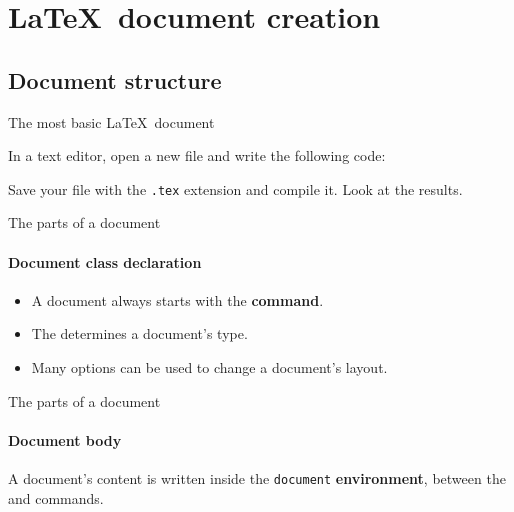 
\section{\LaTeX\ document creation}

\subsection{Document structure}

\begin{frame}[c,fragile]{The most basic \LaTeX\ document}

	In a text editor, open a new file and write the following code:
	

	Save your file with the \texttt{.tex} extension and compile it. Look at the results.
	
\end{frame}

\begin{frame}[c,fragile]{The parts of a document}
	\framesubtitle{Document class declaration}
	\begin{itemize}
		\item A document always starts with the  \textbf{command}.
		

		\item The 
			determines a document's type.		
		\item Many options can be used to change a document's layout.
	\end{itemize}
\end{frame}

\begin{frame}[c,fragile]{The parts of a document}
	\framesubtitle{Document body}
	A document's content is written inside the \texttt{document} \textbf{environment},
	between the  and  commands.
\end{frame}

